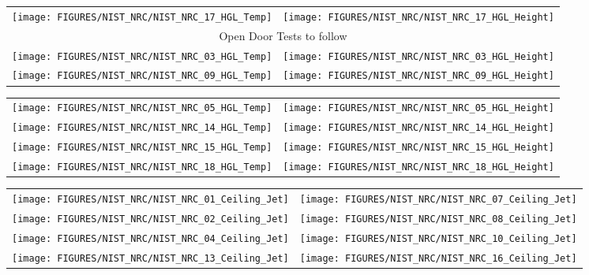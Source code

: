 \clearpage

\begin{figure}[p]
\begin{tabular*}{\textwidth}{l@{\extracolsep{\fill}}r}
\texttt{[image: FIGURES/NIST\_NRC/NIST\_NRC\_17\_HGL\_Temp]} &
\texttt{[image: FIGURES/NIST\_NRC/NIST\_NRC\_17\_HGL\_Height]} \\
\multicolumn{2}{c}{Open Door Tests to follow} \\
\texttt{[image: FIGURES/NIST\_NRC/NIST\_NRC\_03\_HGL\_Temp]} &
\texttt{[image: FIGURES/NIST\_NRC/NIST\_NRC\_03\_HGL\_Height]} \\
\texttt{[image: FIGURES/NIST\_NRC/NIST\_NRC\_09\_HGL\_Temp]} &
\texttt{[image: FIGURES/NIST\_NRC/NIST\_NRC\_09\_HGL\_Height]}
\end{tabular*}
\end{figure}

\begin{figure}[p]
\begin{tabular*}{\textwidth}{l@{\extracolsep{\fill}}r}
\texttt{[image: FIGURES/NIST\_NRC/NIST\_NRC\_05\_HGL\_Temp]} &
\texttt{[image: FIGURES/NIST\_NRC/NIST\_NRC\_05\_HGL\_Height]} \\
\texttt{[image: FIGURES/NIST\_NRC/NIST\_NRC\_14\_HGL\_Temp]} &
\texttt{[image: FIGURES/NIST\_NRC/NIST\_NRC\_14\_HGL\_Height]} \\
\texttt{[image: FIGURES/NIST\_NRC/NIST\_NRC\_15\_HGL\_Temp]} &
\texttt{[image: FIGURES/NIST\_NRC/NIST\_NRC\_15\_HGL\_Height]} \\
\texttt{[image: FIGURES/NIST\_NRC/NIST\_NRC\_18\_HGL\_Temp]} &
\texttt{[image: FIGURES/NIST\_NRC/NIST\_NRC\_18\_HGL\_Height]}
\end{tabular*}
\end{figure}

\clearpage

\begin{figure}[p]
\begin{tabular*}{\textwidth}{l@{\extracolsep{\fill}}r}
\texttt{[image: FIGURES/NIST\_NRC/NIST\_NRC\_01\_Ceiling\_Jet]} &
\texttt{[image: FIGURES/NIST\_NRC/NIST\_NRC\_07\_Ceiling\_Jet]} \\
\texttt{[image: FIGURES/NIST\_NRC/NIST\_NRC\_02\_Ceiling\_Jet]} &
\texttt{[image: FIGURES/NIST\_NRC/NIST\_NRC\_08\_Ceiling\_Jet]} \\
\texttt{[image: FIGURES/NIST\_NRC/NIST\_NRC\_04\_Ceiling\_Jet]} &
\texttt{[image: FIGURES/NIST\_NRC/NIST\_NRC\_10\_Ceiling\_Jet]} \\
\texttt{[image: FIGURES/NIST\_NRC/NIST\_NRC\_13\_Ceiling\_Jet]} &
\texttt{[image: FIGURES/NIST\_NRC/NIST\_NRC\_16\_Ceiling\_Jet]}
\end{tabular*}
\label{NIST_NRC_Jet_Closed}
\end{figure}

